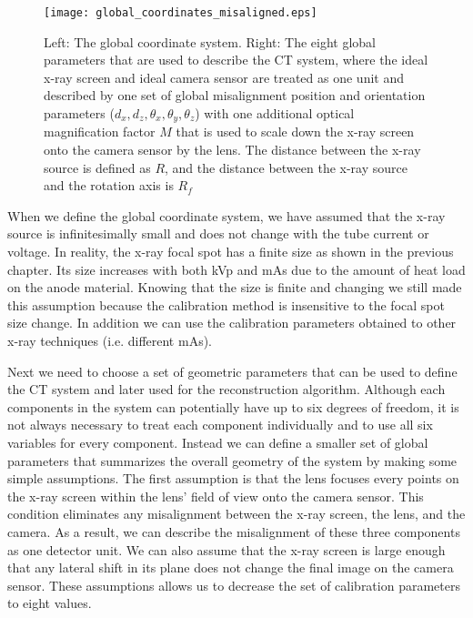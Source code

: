 \begin{figure}[ht]
\centering
\texttt{[image: global\_coordinates\_misaligned.eps]}
\caption{Left: The global coordinate system.  Right: The eight global parameters that are used to describe the CT system, where the ideal x-ray screen and ideal camera sensor are treated as one unit and described by one set of global misalignment position and orientation parameters ($d_x, d_z, \theta_x, \theta_y, \theta_z$) with one additional optical magnification factor $M$ that is used to scale down the x-ray screen onto the camera sensor by the lens.  The distance between the x-ray source is defined as $R$, and the distance between the x-ray source and the rotation axis is $R_f$}
\label{fig:global_coord_misaligned}
\end{figure}

When we define the global coordinate system, we have assumed that the x-ray source is infinitesimally small and does not change with the tube current or voltage.  In reality, the x-ray focal spot has a finite size as shown in the previous chapter.  Its size increases with both kVp and mAs due to the amount of heat load on the anode material.  Knowing that the size is finite and changing we still made this assumption because the calibration method is insensitive to the focal spot size change.  In addition we can use the calibration parameters obtained  to other x-ray techniques (i.e. different mAs). 

Next we need to choose a set of geometric parameters that can be used to define the CT system and later used for the reconstruction algorithm.  Although each components in the system can potentially have up to six degrees of freedom, it is not always necessary to treat each component individually and to use all six variables for every component.  Instead we can define a smaller set of global parameters that summarizes the overall geometry of the system by making some simple assumptions.  The first assumption is that the lens focuses every points on the x-ray screen within the lens' field of view onto the camera sensor.  This condition eliminates any misalignment between the x-ray screen, the lens, and the camera.  As a result, we can describe the misalignment of these three components as one detector unit.  We can also assume that the x-ray screen is large enough that any lateral shift in its plane does not change the final image on the camera sensor.  These assumptions allows us to decrease the set of calibration parameters to eight values.

